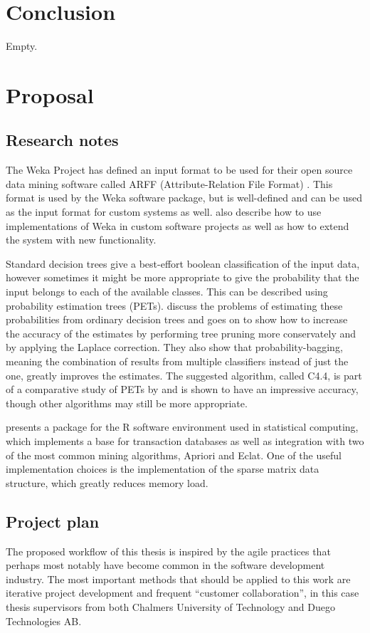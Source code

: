 \documentclass[11pt,a4paper]{report}
\begin{document}
\chapter{Conclusion}
Empty.

\chapter{Proposal}

\section{Research notes}
The Weka Project has defined an input format to be used for their open source data mining software called ARFF (Attribute-Relation File Format) \citep{Garner1995, Witten2011}. This format is used by the Weka software package, but is well-defined and can be used as the input format for custom systems as well. \citet{Witten2011} also describe how to use implementations of Weka in custom software projects as well as how to extend the system with new functionality.

Standard decision trees give a best-effort boolean classification of the input data, however sometimes it might be more appropriate to give the probability that the input belongs to each of the available classes. This can be described using probability estimation trees (PETs). \citet{Provost2003} discuss the problems of estimating these probabilities from ordinary decision trees and goes on to show how to increase the accuracy of the estimates by performing tree pruning more conservately and by applying the Laplace correction. They also show that probability-bagging, meaning the combination of results from multiple classifiers instead of just the one, greatly improves the estimates. The suggested algorithm, called C4.4, is part of a comparative study of PETs by \citet{Chu2011} and is shown to have an impressive accuracy, though other algorithms may still be more appropriate.

\citet{Hahsler2007} presents a package for the R software environment used in statistical computing, which implements a base for transaction databases as well as integration with two of the most common mining algorithms, Apriori and Eclat. One of the useful implementation choices is the implementation of the sparse matrix data structure, which greatly reduces memory load.

\section{Project plan}
The proposed workflow of this thesis is inspired by the agile practices that perhaps most notably have become common in the software development industry. The most important methods that should be applied to this work are iterative project development and frequent ``customer collaboration'', in this case thesis supervisors from both Chalmers University of Technology and Duego Technologies AB.
\end{document}

